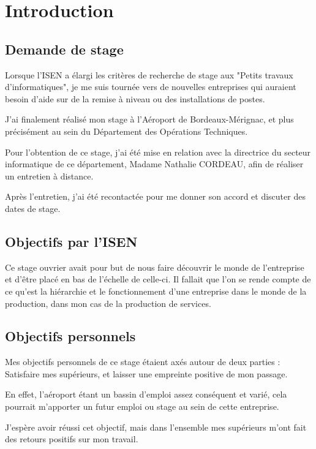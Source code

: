 \section*{Introduction}

\subsection{Demande de stage}

Lorsque l'ISEN a élargi les critères de recherche de stage aux "Petits travaux d'informatiques", je me suis tournée vers de nouvelles entreprises qui auraient besoin d'aide sur de la remise à niveau ou des installations de postes.

J'ai finalement réalisé mon stage à l'Aéroport de Bordeaux-Mérignac, et plus précisément au sein du Département des Opérations Techniques.

Pour l'obtention de ce stage, j'ai été mise en relation avec la directrice du secteur informatique de ce département, Madame Nathalie CORDEAU, afin de réaliser un entretien à distance. 

Après l'entretien, j'ai été recontactée pour me donner son accord et discuter des dates de stage.

\subsection{Objectifs par l'ISEN}

Ce stage ouvrier avait pour but de nous faire découvrir le monde de l'entreprise et d'être placé en bas de l'échelle de celle-ci. Il fallait que l'on se rende compte de ce qu'est la hiérarchie et le fonctionnement d'une entreprise dans le monde de la production, dans mon cas de la production de services.

\subsection{Objectifs personnels}

Mes objectifs personnels de ce stage étaient axés autour de deux parties : Satisfaire mes supérieurs, et laisser une empreinte positive de mon passage.

En effet, l'aéroport étant un bassin d'emploi assez conséquent et varié, cela pourrait m'apporter un futur emploi ou stage au sein de cette entreprise.

J'espère avoir réussi cet objectif, mais dans l'ensemble mes supérieurs m'ont fait des retours positifs sur mon travail.